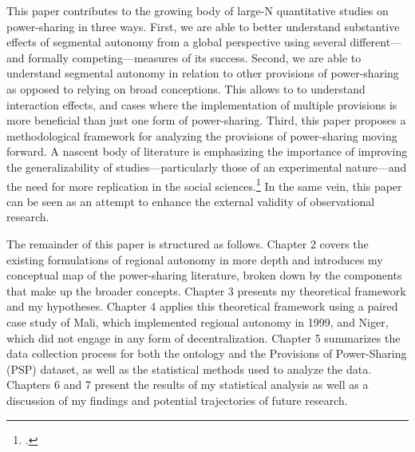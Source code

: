\documentclass[12pt]{article}
\begin{document}
This paper contributes to the growing body of large-N quantitative studies on power-sharing in three ways. First, we are able to better understand substantive effects of segmental autonomy from a global perspective using several different---and formally competing---measures of its success. Second, we are able to understand segmental autonomy in relation to other provisions of power-sharing as opposed to relying on broad conceptions. This allows to to understand interaction effects, and cases where the implementation of multiple provisions is more beneficial than just one form of power-sharing. Third, this paper proposes a methodological framework for analyzing the provisions of power-sharing moving forward. A nascent body of literature is emphasizing the importance of improving the generalizability of studies---particularly those of an experimental nature---and the need for more replication in the social sciences.\footcite{dunning_information_2020, dunning_replicate_2014} In the same vein, this paper can be seen as an attempt to enhance the external validity of observational research. 

The remainder of this paper is structured as follows. Chapter 2 covers the existing formulations of regional autonomy in more depth and introduces my conceptual map of the power-sharing literature, broken down by the components that make up the broader concepts. Chapter 3 presents my theoretical framework and my hypotheses. Chapter 4 applies this theoretical framework using a paired case study of Mali, which implemented regional autonomy in 1999, and Niger, which did not engage in any form of decentralization. Chapter 5 summarizes the data collection process for both the ontology and the Provisions of Power-Sharing (PSP) dataset, as well as the statistical methods used to analyze the data. Chapters 6 and 7 present the results of my statistical analysis as well as a discussion of my findings and potential trajectories of future research. 
\end{document}
